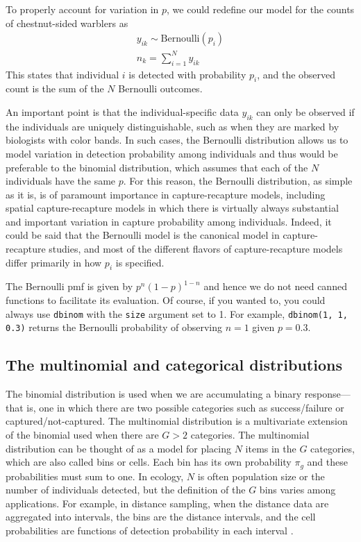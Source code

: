 To properly account for variation in $p$, we could redefine our model
for the counts of chestnut-sided warblers as
\begin{gather}
y_{ik} \sim \text{Bernoulli}(p_i) \nonumber \\%
n_k = \sum_{i=1}^N y_{ik}
\label{modeling.eq.Bern}
\end{gather}
This  states that individual $i$ is detected with probability
$p_i$, and the observed count is the sum of the $N$ Bernoulli
outcomes.

An important point is that the individual-specific data $y_{ik}$ can only be
observed  if the individuals are uniquely distinguishable, such as when they
are marked by biologists with color bands.
In such cases, the Bernoulli distribution allows us to
model variation in detection probability among individuals and thus
would be preferable to the binomial distribution, which assumes that each
of the $N$ individuals have the same $p$.
For this reason, the Bernoulli
distribution, as simple as it is, is of paramount importance in
capture-recapture models, including spatial capture-recapture models
in which there is virtually always substantial and important variation in capture probability
among individuals. Indeed, it could be said that the Bernoulli model is the
canonical model in capture-recapture studies, and most of the
different flavors of capture-recapture models differ primarily in how $p_i$ is
specified.

The Bernoulli pmf is given by  $p^n(1-p)^{1-n}$ and hence we do not need canned
functions to facilitate its evaluation. Of course, if you wanted to, you
could always use \verb+dbinom+ with the \verb+size+ argument set to
1. For example, \verb+dbinom(1, 1, 0.3)+ returns the Bernoulli probability of
observing $n=1$ given $p=0.3$.

\subsection{The multinomial and categorical distributions}
\label{modeling.sec.multinom}

The binomial distribution is used
when we are accumulating a binary response---that is, one in which
there are two possible categories such as success/failure or
captured/not-captured.
The multinomial distribution is a multivariate extension of
the binomial used when there are $G>2$ categories.
The multinomial distribution can be thought of as a model for placing
$N$ items in the $G$ categories, which are also called bins or cells. Each bin has
its own probability $\pi_g$ and these probabilities must sum to one.
In ecology, $N$ is often population size or the number of individuals
detected, but the definition of the $G$ bins varies among
applications. For example, in distance sampling, when the distance
data are aggregated into intervals,
the bins are the distance intervals, and the cell probabilities are
functions of detection probability in each interval \citep{royle_etal:2004}.

